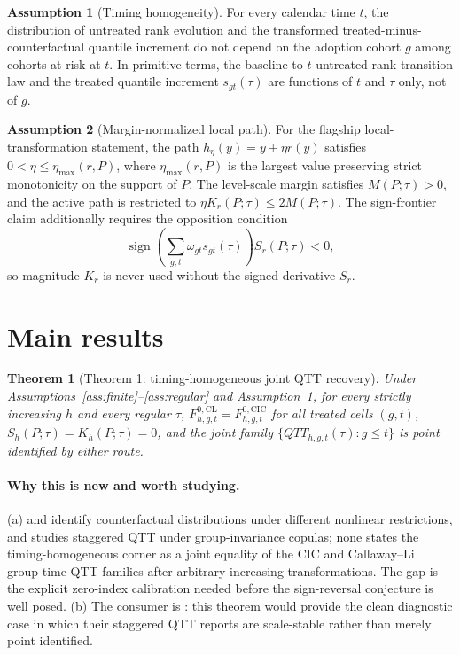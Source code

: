\documentclass[11pt]{article}
\theoremstyle{definition}
\newtheorem{assumption}{Assumption}
\theoremstyle{plain}
\newtheorem{theorem}{Theorem}
\theoremstyle{remark}
\begin{document}
\begin{assumption}[Timing homogeneity]\label{ass:timing-homogeneity}
For every calendar time \(t\), the distribution of untreated rank evolution and
the transformed treated-minus-counterfactual quantile increment do not depend on
the adoption cohort \(g\) among cohorts at risk at \(t\).  In primitive terms,
the baseline-to-\(t\) untreated rank-transition law and the treated quantile
increment \(s_{gt}(\tau)\) are functions of \(t\) and \(\tau\) only, not of \(g\).
\end{assumption}

\begin{assumption}[Margin-normalized local path]\label{ass:margin}
For the flagship local-transformation statement, the path \(h_\eta(y)=y+\eta r(y)\)
satisfies \(0<\eta\le \eta_{\max}(r,P)\), where \(\eta_{\max}(r,P)\) is the
largest value preserving strict monotonicity on the support of \(P\).  The
level-scale margin satisfies \(M(P;\tau)>0\), and the active path is restricted
to \(\eta K_r(P;\tau)\le 2M(P;\tau)\).  The sign-frontier claim additionally
requires the opposition condition
\[
\operatorname{sign}\!\left(\sum_{g,t}\omega_{gt}s_{gt}(\tau)\right)S_r(P;\tau)<0,
\]
so magnitude \(K_r\) is never used without the signed derivative \(S_r\).
\end{assumption}

\section{Main results}
\begin{theorem}[Theorem 1: timing-homogeneous joint QTT recovery]\label{thm:timing-homogeneous}
Under Assumptions~\ref{ass:finite}--\ref{ass:regular} and
Assumption~\ref{ass:timing-homogeneity}, for every strictly increasing \(h\) and
every regular \(\tau\), \(F^{0,\mathrm{CL}}_{h,g,t}=F^{0,\mathrm{CIC}}_{h,g,t}\)
for all treated cells \((g,t)\), \(S_h(P;\tau)=K_h(P;\tau)=0\), and the joint family
\(\{QTT_{h,g,t}(\tau):g\le t\}\) is point identified by either route.
\end{theorem}
\paragraph{Why this is new and worth studying.}
(a) \citet{AtheyImbens2006} and \citet{CallawayLi2019} identify counterfactual
distributions under different nonlinear restrictions, and \citet{LiLin2024}
studies staggered QTT under group-invariance copulas; none states the
timing-homogeneous corner as a joint equality of the CIC and Callaway--Li
group-time QTT families after arbitrary increasing transformations.  The gap is
the explicit zero-index calibration needed before the sign-reversal conjecture is
well posed.  (b) The consumer is \citet{LiLin2024}: this theorem would provide the
clean diagnostic case in which their staggered QTT reports are scale-stable rather
than merely point identified.
\end{document}
